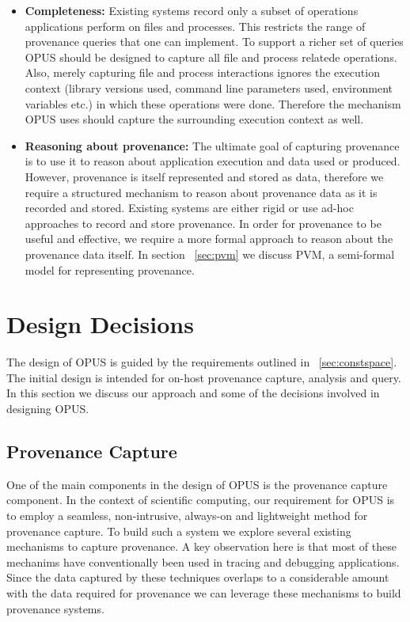 \documentclass[withindex,glossary]{cam-thesis}
\begin{document}
\begin{itemize}
\item \textbf{Completeness:} 
Existing systems record only a subset of operations applications perform on files and processes. This restricts the range of provenance queries that one can implement. To support a richer set of queries OPUS should be designed to capture all file and process relatede operations. Also, merely capturing file and process interactions ignores the execution context (library versions used, command line parameters used, environment variables etc.) in which these operations were done. Therefore the mechanism OPUS uses should capture the surrounding execution context as well. 

\item \textbf{Reasoning about provenance:} 
The ultimate goal of capturing provenance is to use it to reason about application execution and data used or produced. However, provenance is itself represented and stored as data, therefore we require a structured mechanism to reason about provenance data as it is recorded and stored. Existing systems are either rigid or use ad-hoc approaches to record and store provenance. In order for provenance to be useful and effective, we require a more formal approach to reason about the provenance data itself. In section ~\ref{sec:pvm} we discuss PVM, a semi-formal model for representing provenance.

\end{itemize}

\section{Design Decisions} 
The design of OPUS is guided by the requirements outlined in ~\ref{sec:constspace}.
The initial design is intended for on-host provenance capture, analysis and query.
In this section we discuss our approach and some of the decisions involved in designing OPUS.


\subsection{Provenance Capture}
One of the main components in the design of OPUS is the provenance capture component.
In the context of scientific computing, our requirement for OPUS is to employ a seamless, non-intrusive, always-on and lightweight method for provenance capture.
To build such a system we explore several existing mechanisms to capture provenance.
A key observation here is that most of these mechanims have conventionally been used in tracing and debugging applications.
Since the data captured by these techniques overlaps to a considerable amount with the data required for provenance we can leverage these mechanisms to build provenance systems.
\end{document}
